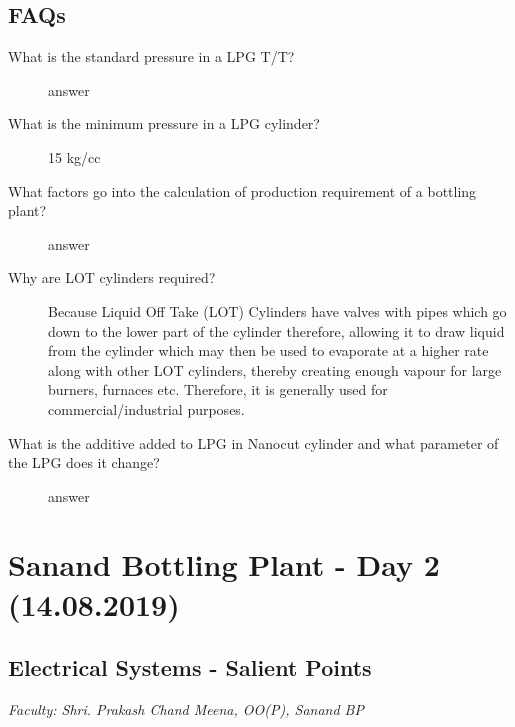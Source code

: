 \documentclass{report}
\begin{document}
	\section{FAQs}
	\begin{description}
		\item[What is the standard pressure in a LPG T/T?] answer
		\item[What is the minimum pressure in a LPG cylinder?] 15 kg/cc
		\item[What factors go into the calculation of production requirement of a bottling plant?] answer
		\item[Why are LOT cylinders required?] Because Liquid Off Take (LOT) Cylinders have valves with pipes which go down to the lower part of the cylinder therefore, allowing it to draw liquid from the cylinder which may then be used to evaporate at a higher rate along with other LOT cylinders, thereby creating enough vapour for large burners, furnaces etc. Therefore, it is generally used for commercial/industrial purposes.
		\item[What is the additive added to LPG in Nanocut cylinder and what parameter of the LPG does it change?] answer
	\end{description}
	\chapter{Sanand Bottling Plant - Day 2 (14.08.2019)}
	\section{Electrical Systems - Salient Points}
	\textit{Faculty: Shri. Prakash Chand Meena, OO(P), Sanand BP}
	
	
\end{document}
